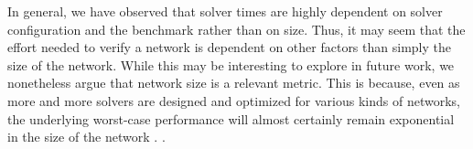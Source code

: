 In general, we have
observed that solver times are highly dependent on solver configuration and the
benchmark rather than on size. Thus, it may seem that the effort needed to
verify a network is dependent on other factors than simply the size of the
network. While this may be interesting to explore in future work, we nonetheless
argue that network size is a relevant metric. This is because, even as more and
more solvers are designed and optimized for various kinds of networks, the
underlying worst-case performance will almost certainly remain exponential in
the size of the network \cite{reluplex}. .

